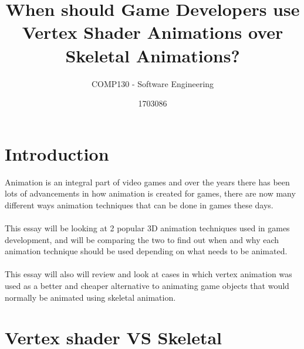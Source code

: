 \documentclass{scrartcl}
\title{When should Game Developers use Vertex Shader Animations over Skeletal Animations?}
\subtitle{COMP130 - Software Engineering}
\author{1703086}
\begin{document}
\maketitle


\section{Introduction}
Animation is an integral part of video games and over the years there has been lots of advancements in how animation is created for games, there are now many different ways animation techniques that can be done in games these days.
\\~\\
This essay will be looking at 2 popular 3D animation techniques used in games development, and will be comparing the two to find out when and why each animation technique should be used depending on what needs to be animated.
\\~\\
This essay will also will review and look at cases in which vertex animation was used as a better and cheaper alternative to animating game objects that would normally be animated using skeletal animation.


\section{Vertex shader VS Skeletal}
\end{document}
